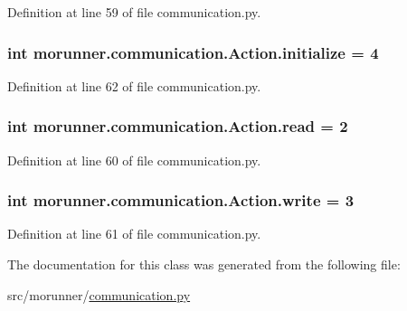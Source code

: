 Definition at line 59 of file communication.\+py.

\hypertarget{classmorunner_1_1communication_1_1Action_a4ecc5485449669bbd974615fe783577d}{}
\subsubsection[{initialize}]{\setlength{\rightskip}{0pt plus 5cm}int morunner.\+communication.\+Action.\+initialize = 4\hspace{0.3cm}{\ttfamily [static]}}\label{classmorunner_1_1communication_1_1Action_a4ecc5485449669bbd974615fe783577d}


Definition at line 62 of file communication.\+py.

\hypertarget{classmorunner_1_1communication_1_1Action_a9e067338328ab2a5f6084c24b6091e0c}{}
\subsubsection[{read}]{\setlength{\rightskip}{0pt plus 5cm}int morunner.\+communication.\+Action.\+read = 2\hspace{0.3cm}{\ttfamily [static]}}\label{classmorunner_1_1communication_1_1Action_a9e067338328ab2a5f6084c24b6091e0c}


Definition at line 60 of file communication.\+py.

\hypertarget{classmorunner_1_1communication_1_1Action_aed47c16770d1f072b7a7d5bb6bfc0e13}{}
\subsubsection[{write}]{\setlength{\rightskip}{0pt plus 5cm}int morunner.\+communication.\+Action.\+write = 3\hspace{0.3cm}{\ttfamily [static]}}\label{classmorunner_1_1communication_1_1Action_aed47c16770d1f072b7a7d5bb6bfc0e13}


Definition at line 61 of file communication.\+py.



The documentation for this class was generated from the following file\+:\begin{DoxyCompactItemize}
\item 
src/morunner/\hyperlink{communication_8py}{communication.\+py}\end{DoxyCompactItemize}
